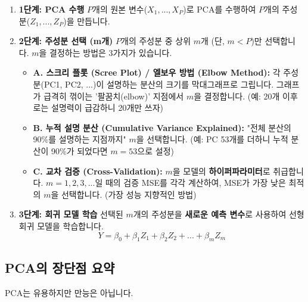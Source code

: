 \documentclass[11pt,a4paper]{book}
\theoremstyle{definition}
\begin{document}
\begin{enumerate}
    \item \textbf{1단계: PCA 수행}
        $P$개의 원본 변수($X_1, ..., X_P$)로 PCA를 수행하여 $P$개의 주성분($Z_1, ..., Z_P$)을 만듭니다.
    \item \textbf{2단계: 주성분 선택 (m개)}
        $P$개의 주성분 중 상위 $m$개 (단, $m < P$)만 선택합니다. $m$을 결정하는 방법은 3가지가 있습니다.
        \begin{itemize}
            \item \textbf{A. 스크리 플롯 (Scree Plot) / 엘보우 방법 (Elbow Method):}
                각 주성분(PC1, PC2, ...)이 설명하는 분산의 크기를 막대그래프로 그립니다. 그래프가 급격히 꺾이는 '팔꿈치(elbow)' 지점에서 $m$을 결정합니다. (예: 20개 이후로는 설명력이 급감하니 20개만 쓰자)
            \item \textbf{B. 누적 설명 분산 (Cumulative Variance Explained):}
                "전체 분산의 90\%를 설명하는 지점까지" $m$을 선택합니다. (예: PC 53개를 더하니 누적 분산이 90\%가 되었다면 $m=53$으로 설정)
            \item \textbf{C. 교차 검증 (Cross-Validation):}
                $m$을 모델의 \textbf{하이퍼파라미터}로 취급합니다. $m=1, 2, 3, ...$일 때의 검증 MSE를 각각 계산하여, MSE가 가장 낮은 최적의 $m$을 선택합니다. (가장 성능 지향적인 방법)
        \end{itemize}
    \item \textbf{3단계: 회귀 모델 학습}
        선택된 $m$개의 주성분을 \textbf{새로운 예측 변수}로 사용하여 선형 회귀 모델을 학습합니다.
        $$ Y = \beta_0 + \beta_1 Z_1 + \beta_2 Z_2 + ... + \beta_m Z_m $$
\end{enumerate}

\subsection{PCA의 장단점 요약}
PCA는 유용하지만 만능은 아닙니다.
\end{document}
